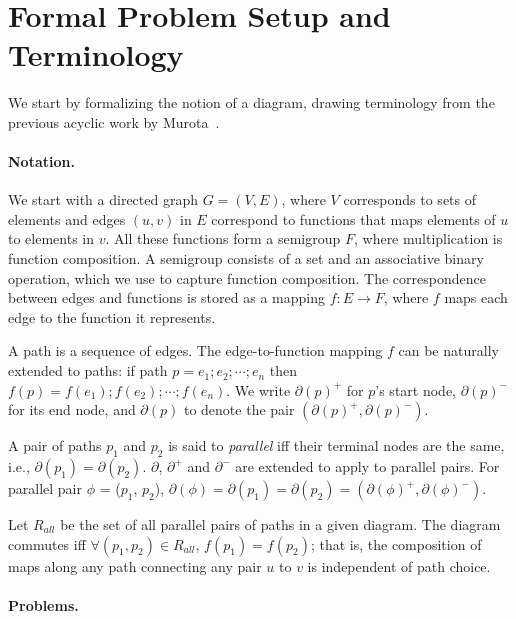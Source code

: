 \documentclass[sigplan,review,nonacm=true]{acmart}
\begin{document}
\section{Formal Problem Setup and Terminology}

We start by formalizing the notion of a diagram, drawing terminology from the previous acyclic work by Murota~\cite{commutative}.

\paragraph{Notation.}

We start with a directed graph $G=(V,E)$, where $V$ corresponds to sets of elements and edges $(u, v)$ in $E$ correspond to functions that maps elements of $u$ to elements in $v$.
All these functions form a semigroup $F$, where multiplication is function composition.
A semigroup consists of a set and an associative binary operation, which we use to capture function composition.
%
The correspondence between edges and functions is stored as a mapping $f:E\rightarrow F$, where $f$ maps each edge to the function it represents.

A path is a sequence of edges. The edge-to-function mapping $f$ can be naturally extended to paths: if path $p=e_1 ; e_2 ; \cdots ; e_n$ then $f(p)=f(e_1) ; f(e_2) ; \cdots ; f(e_n)$.
%
We write $\partial(p)^{+}$ for $p$'s start node, $\partial(p)^{-}$ for its end node, and $\partial(p)$ to denote the pair
$(\partial(p)^{+}, \partial(p)^{-})$.

A pair of paths $p_1$ and $p_2$ is said to \textit{parallel} iff their terminal nodes are the same, i.e., $\partial(p_1)=\partial(p_2)$.
$\partial$, $\partial^{+}$ and $\partial^{-}$ are extended to apply to parallel pairs.
For parallel pair $\phi$ = ($p_1$, $p_2$), $\partial(\phi)=\partial(p_1)=\partial(p_2)=(\partial(\phi)^{+}, \partial(\phi)^{-})$.

Let $R_{all}$ be the set of all parallel pairs of paths in a given diagram.
The diagram commutes iff
$\forall (p_1,p_2)\in R_{all}$,
$f(p_1)=f(p_2)$; that is, the composition of maps along any path connecting any pair $u$ to $v$ is independent of path choice.

\paragraph{Problems.}
\end{document}
